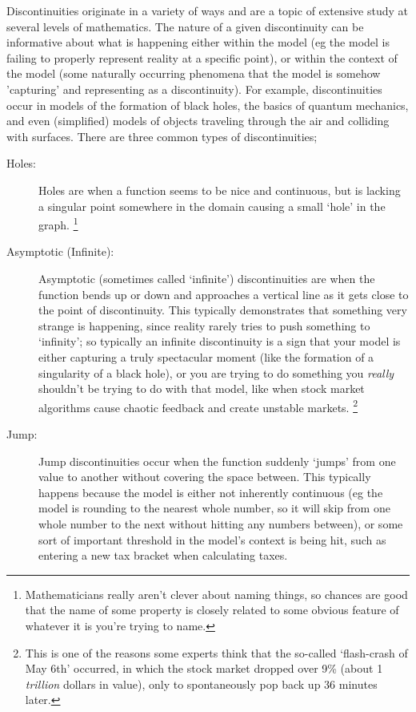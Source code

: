 \documentclass{ximeraXloud}
\begin{document}
    Discontinuities originate in a variety of ways and are a topic of extensive study at several levels of mathematics. The nature of a given discontinuity can be informative about what is happening either within the model (eg the model is failing to properly represent reality at a specific point), or within the context of the model (some naturally occurring phenomena that the model is somehow 'capturing' and representing as a discontinuity). For example, discontinuities occur in models of the formation of black holes, the basics of quantum mechanics, and even (simplified) models of objects traveling through the air and colliding with surfaces. There are three common types of discontinuities;
    \begin{description}
        \item[Holes:] Holes are when a function seems to be nice and continuous, but is lacking a singular point somewhere in the domain causing a small `hole' in the graph.%
            \footnote{%
                Mathematicians really aren't clever about naming things, so chances are good that the name of some property is closely related to some obvious feature of whatever it is you're trying to name.%
                }
        \item[Asymptotic (Infinite):] Asymptotic (sometimes called `infinite') discontinuities are when the function bends up or down and approaches a vertical line as it gets close to the point of discontinuity. This typically demonstrates that something very strange is happening, since reality rarely tries to push something to `infinity'; so typically an infinite discontinuity is a sign that your model is either capturing a truly spectacular moment (like the formation of a singularity of a black hole), or you are trying to do something you \textit{really} shouldn't be trying to do with that model, like when stock market algorithms cause chaotic feedback and create unstable markets.%
            \footnote{%
                This is one of the reasons some experts think that the so-called `flash-crash of May 6th' occurred, in which the stock market dropped over 9\% (about 1 \textit{trillion} dollars in value), only to spontaneously pop back up 36 minutes later.%
                }
        \item[Jump:] Jump discontinuities occur when the function suddenly `jumps' from one value to another without covering the space between. This typically happens because the model is either not inherently continuous (eg the model is rounding to the nearest whole number, so it will skip from one whole number to the next without hitting any numbers between), or some sort of important threshold in the model's context is being hit, such as entering a new tax bracket when calculating taxes.
    \end{description}
\end{document}
